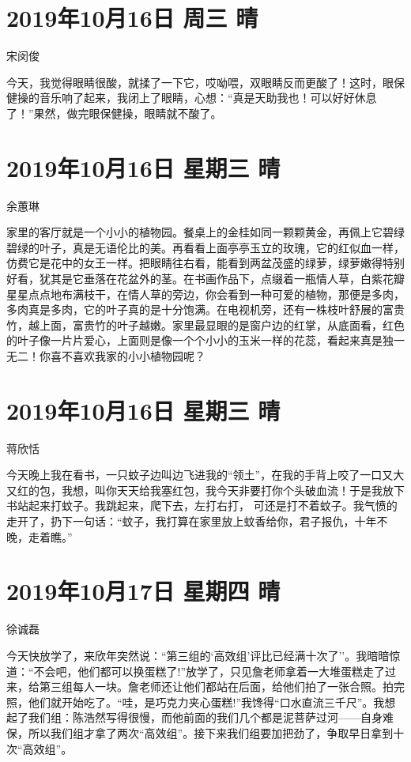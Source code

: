 \section{2019年10月16日 周三 晴}

宋闵俊

今天，我觉得眼睛很酸，就揉了一下它，哎呦喂，双眼睛反而更酸了！这时，眼保健操的音乐响了起来，我闭上了眼睛，心想：``真是天助我也！可以好好休息了！''果然，做完眼保健操，眼睛就不酸了。

\section{2019年10月16日 星期三 晴}

余蕙琳

家里的客厅就是一个小小的植物园。餐桌上的金桂如同一颗颗黄金，再佩上它碧绿碧绿的叶子，真是无语伦比的美。再看看上面亭亭玉立的玫瑰，它的红似血一样，仿费它是花中的女王一样。把眼睛往右看，能看到两盆茂盛的绿萝，绿萝嫩得特别好看，犹其是它垂落在花盆外的茎。在书画作品下，点缀着一瓶情人草，白紫花瓣星星点点地布满枝干，在情人草的旁边，你会看到一种可爱的植物，那便是多肉，多肉真是多肉，它的叶子真的是十分饱满。在电视机旁，还有一株枝叶舒展的富贵竹，越上面，富贵竹的叶子越嫩。家里最显眼的是窗户边的红掌，从底面看，红色的叶子像一片片爱心，上面则是像一个个小小的玉米一样的花蕊，看起来真是独一无二！你喜不喜欢我家的小小植物园呢？

\section{2019年10月16日 星期三 晴}

蒋欣恬

今天晚上我在看书，一只蚊子边叫边飞进我的``领土''，在我的手背上咬了一口又大又红的包，我想，叫你天天给我塞红包，我今天非要打你个头破血流！于是我放下书站起来打蚊子。我跳起来，爬下去，左打右打，
可还是打不着蚊子。我气愤的走开了，扔下一句话：``蚊子，我打算在家里放上蚊香给你，君子报仇，十年不晚，走着瞧。''

\section{2019年10月17日 星期四 晴}

徐诚磊

今天快放学了，来欣年突然说：``第三组的`高效组'评比已经满十次了''。我暗暗惊道：``不会吧，他们都可以换蛋糕了!''放学了，只见詹老师拿着一大堆蛋糕走了过来，给第三组每人一块。詹老师还让他们都站在后面，给他们拍了一张合照。拍完照，他们就开始吃了。``哇，是巧克力夹心蛋糕!''我馋得``口水直流三千尺''。我想起了我们组：陈浩然写得很慢，而他前面的我们几个都是泥菩萨过河------自身难保，所以我们组才拿了两次``高效组''。接下来我们组要加把劲了，争取早日拿到十次``高效组''。

